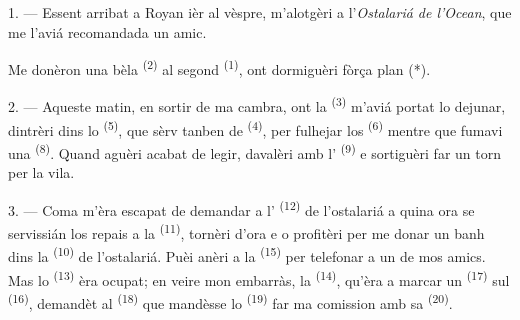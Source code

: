 %


\VUsaut{3.0mm}
\VUsaut{1.6mm}
\VUsaut{2.0mm}
\VUsaut{3.4mm}

1. --- Essent arribat a Royan ièr al vèspre, m'alotgèri a l'\textit{Ostalariá de
l'Ocean}, que me l'aviá recomandada un amic.

Me donèron una bèla  \textsuperscript{(2)} al segond
 \textsuperscript{(1)}, ont dormiguèri fòrça plan (*).

2. --- Aqueste matin, en sortir de ma cambra, ont la 
\textsuperscript{(3)} m'aviá portat lo dejunar, dintrèri dins lo  \textsuperscript{(5)}, que sèrv tanben de 
\textsuperscript{(4)}, per fulhejar los  \textsuperscript{(6)}
mentre que fumavi una  \textsuperscript{(8)}. Quand aguèri
acabat de legir, davalèri amb l' \textsuperscript{(9)} e sortiguèri
far un torn per la vila.

3. --- Coma m'èra escapat de demandar a l'
\textsuperscript{(12)} de l'ostalariá a quina ora se servissián los repais a la
 \textsuperscript{(11)}, tornèri d'ora e o profitèri per me
donar un banh dins la  \textsuperscript{(10)} de
l'ostalariá. Puèi anèri a la  \textsuperscript{(15)} per telefonar
a un de mos amics. Mas lo  \textsuperscript{(13)} èra ocupat; en
veire mon embarràs, la  \textsuperscript{(14)}, qu'èra a marcar
un  \textsuperscript{(17)} sul 
\textsuperscript{(16)}, demandèt al  \textsuperscript{(18)}
que mandèsse lo  \textsuperscript{(19)} far ma comission amb sa
 \textsuperscript{(20)}.

